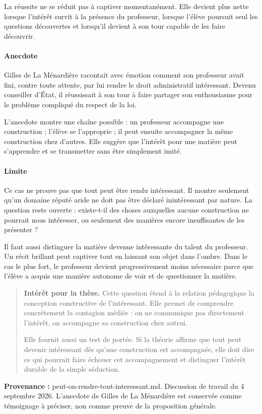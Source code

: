 \documentclass[10pt,a4paper]{article}
\begin{document}
La réussite ne se réduit pas à captiver momentanément. Elle devient plus nette lorsque l'intérêt survit à la présence du professeur, lorsque l'élève poursuit seul les questions découvertes et lorsqu'il devient à son tour capable de les faire découvrir.

\paragraph{Anecdote}
Gilles de La Ménardière racontait avec émotion comment son professeur avait fini, contre toute attente, par lui rendre le droit administratif intéressant. Devenu conseiller d'État, il réussissait à son tour à faire partager son enthousiasme pour le problème compliqué du respect de la loi.

L'anecdote montre une chaîne possible : un professeur accompagne une construction ; l'élève se l'approprie ; il peut ensuite accompagner la même construction chez d'autres. Elle suggère que l'intérêt pour une matière peut s'apprendre et se transmettre sans être simplement imité.

\paragraph{Limite}
Ce cas ne prouve pas que tout peut être rendu intéressant. Il montre seulement qu'un domaine réputé aride ne doit pas être déclaré inintéressant par nature. La question reste ouverte : existe-t-il des choses auxquelles aucune construction ne pourrait nous intéresser, ou seulement des manières encore insuffisantes de les présenter ?

Il faut aussi distinguer la matière devenue intéressante du talent du professeur. Un récit brillant peut captiver tout en laissant son objet dans l'ombre. Dans le cas le plus fort, le professeur devient progressivement moins nécessaire parce que l'élève a acquis une manière autonome de voir et de questionner la matière.

\begin{quote}
\textbf{Intérêt pour la thèse.} Cette question étend à la relation pédagogique la conception constructive de l'intéressant. Elle permet de comprendre concrètement la contagion médiée : on ne communique pas directement l'intérêt, on accompagne sa construction chez autrui.

Elle fournit aussi un test de portée. Si la théorie affirme que tout peut devenir intéressant dès qu'une construction est accompagnée, elle doit dire ce qui pourrait faire échouer cet accompagnement et distinguer l'intérêt durable de la simple séduction.
\end{quote}
{\footnotesize\color{metadata}\textbf{Provenance :} peut-on-rendre-tout-interessant.md. Discussion de travail du 4 septembre 2026. L'anecdote de Gilles de La Ménardière est conservée comme témoignage à préciser, non comme preuve de la proposition générale.\par}
\end{document}
